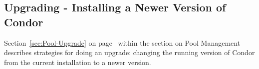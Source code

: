\subsection{\label{sec:upgrade-directions}Upgrading - Installing a Newer
Version of Condor}
Section~\ref{sec:Pool-Upgrade}  on page~\pageref{sec:Pool-Upgrade}
within the section on Pool Management describes 
strategies for doing an upgrade:
changing the running version of Condor 
from the current installation to a newer version.



